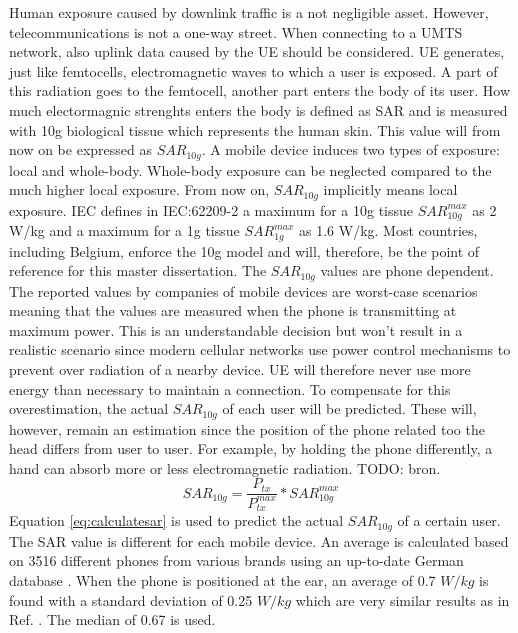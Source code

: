 Human exposure caused by downlink traffic is a not negligible asset. However, telecommunications is not a one-way street. When connecting to a UMTS network, also uplink data caused by the \gls{UE} should be considered.
\gls{UE} generates, just like femtocells, electromagnetic waves to which a user is exposed. A part of this radiation goes to the femtocell, another part enters the body of its user. How much electormagnic strenghts enters the body is defined as \gls{SAR} and is measured with 10g biological tissue which represents the human skin. This value will from now on be expressed as $SAR_{10g}$. 
A mobile device induces two types of exposure: local and whole-body. Whole-body exposure can be neglected compared to the much higher local exposure\cite{j10.1.1_gati2010duality}.  From now on, $SAR_{10g}$ implicitly means local exposure.
\gls{IEC} defines in IEC:62209-2 a maximum for a 10g tissue $SAR^{max}_{10g}$ as 2 W/kg and a maximum for a 1g tissue $SAR^{max}_{1g}$ as 1.6 W/kg. Most countries, including Belgium, enforce the 10g model and will, therefore, be the point of reference for this master dissertation.
The $SAR_{10g}$ values are phone dependent. The reported values by companies of mobile devices are worst-case scenarios meaning that the values are measured when the phone is transmitting at maximum power. This is an understandable decision but won't result in a realistic scenario since modern cellular networks use power control mechanisms to prevent over radiation of a nearby device. \gls{UE} will therefore never use more energy than necessary to maintain a connection.
To compensate for this overestimation, the actual $SAR_{10g}$ of each user will be predicted. These will, however, remain an estimation since the position of the phone related too the head differs from user to user. For example, by holding the phone differently, a hand can absorb more or less electromagnetic radiation. TODO: bron.
\begin{equation}
{SAR}_{10g} = \frac{P_{tx}}{P^{max}_{tx}} * {SAR}^{max}_{10g}
\label{eq:calculatesar}
\end{equation}
Equation \ref{eq:calculatesar} is used to predict the actual $SAR_{10g}$  of a certain user. The \gls{SAR} value is different for each mobile device. An average is calculated based on 3516 different phones from various brands using an up-to-date German database \cite{SARDatabase}.
When the phone is positioned at the ear, an average of 0.7 $W/kg$ is found with a standard deviation of 0.25 $W/kg$ which are very similar results as in Ref. \cite{j10.1.1_gati2010duality}. The median of 0.67 is used.


